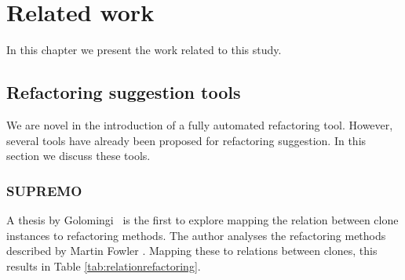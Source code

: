 \chapter{Related work} \label{ch:related_work}
In this chapter we present the work related to this study.

\section{Refactoring suggestion tools}
We are novel in the introduction of a fully automated refactoring tool. However, several tools have already been proposed for refactoring suggestion. In this section we discuss these tools.

\subsection{SUPREMO}
A thesis by Golomingi~\cite{koni2001scenario} is the first to explore mapping the relation between clone instances to refactoring methods. The author analyses the refactoring methods described by Martin Fowler \cite{fowler1999refactoring}. Mapping these to relations between clones, this results in Table \ref{tab:relationrefactoring}.

